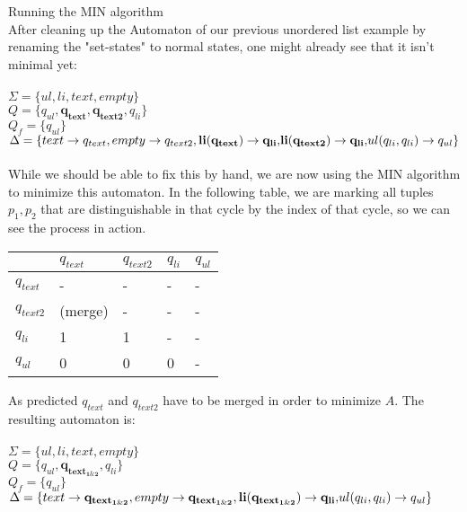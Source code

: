 \documentclass{llncs}
\begin{document}
\begin{example}{Running the MIN algorithm}\\
After cleaning up the Automaton of our previous unordered list example by renaming the "set-states" to normal states, one might already see that it isn't minimal yet:\\\\
				\automatonDefinition
				\(\Sigma = \{ul, li, text, empty\}\)
				\\
				\(Q = \{q_{ul}, \mathbf{q_{text}, q_{text2}}, q_{li}\}\)
				\\
				\(Q_f = \{ q_{ul} \}\)
				\\
				\(\Delta = \{		text \rightarrow q_{text},
				\\
				empty \rightarrow q_{text2},
				\\
				\mathbf{
					li(q_{text}) \rightarrow q_{li},	
				}	
				\\
				\mathbf {
					li(q_{text2}) \rightarrow q_{li},
				}
				\\
				ul(q_{li}, q_{li}) \rightarrow q_{ul}
				\}\)
				\\
				\\
While we should be able to fix this by hand, we are now using the MIN algorithm to minimize this automaton. In the following table, we are marking all tuples \(p_1, p_2\) that are distinguishable in that cycle by the index of that cycle, so we can see the process in action.
\begin{center}
	\begin{tabular}{| l |  l | l | l |  l  |}
		\hline
		&	 \(q_{text}\) 	& 	\(q_{text2}\) 	& 	\(q_{li}\)  	& 	\(q_{ul}\) 	\\ \hline
		\(q_{text}\) 	&	-			&	-			&	-		&	-		\\ \hline
		\(q_{text2}\) 	&	(merge)	&	-		&	-		&	-		\\ \hline
		\(q_{li}\) 		&	1			&	1			&	-		&	-		\\ \hline
		\(q_{ul}\) 		&	0			&	0			&	0		&	-		\\
		\hline
	\end{tabular}
\end{center}

\pagebreak

\noindent
As predicted \(q_{text}\) and \(q_{text2}\) have to be merged in order to minimize \(A\). The resulting automaton is:
\\
\\
\automatonDefinition
\(\Sigma = \{ul, li, text, empty\}\)
\\
\(Q = \{q_{ul}, \mathbf{q_{text_{1\&2}}}, q_{li}\}\)
\\
\(Q_f = \{ q_{ul} \}\)
\\
\(\Delta = \{		text \rightarrow \mathbf{q_{text_{1\&2}}},
\\
empty \rightarrow \mathbf{q_{text_{1\&2}}},
\\
\mathbf{
	li(q_{text_{1\&2}}) \rightarrow q_{li},	
}
\\
ul(q_{li}, q_{li}) \rightarrow q_{ul}
\}\)
\\
\\
\end{example}
\end{document}
